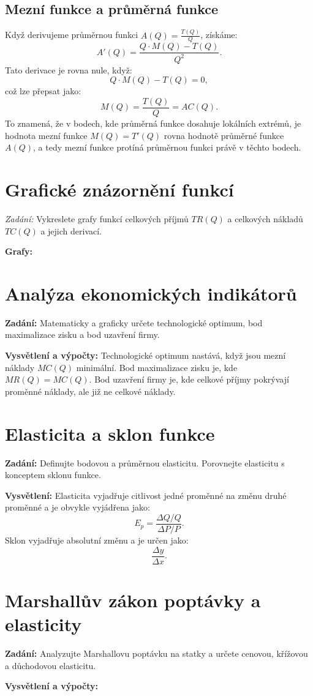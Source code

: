 \documentclass{article}
\begin{document}
\subsection{Mezní funkce a průměrná funkce}
Když derivujeme průměrnou funkci \( A(Q) = \frac{T(Q)}{Q} \), získáme:
\[ A'(Q) = \frac{Q \cdot M(Q) - T(Q)}{Q^2}. \]
Tato derivace je rovna nule, když:
\[ Q \cdot M(Q) - T(Q) = 0, \]
což lze přepsat jako:
\[ M(Q) = \frac{T(Q)}{Q} = AC(Q). \]
To znamená, že v bodech, kde průměrná funkce dosahuje lokálních extrémů, je hodnota mezní funkce \( M(Q) = T'(Q) \) rovna hodnotě průměrné funkce \( A(Q) \), a tedy mezní funkce protíná průměrnou funkci právě v těchto bodech.

\section{Grafické znázornění funkcí}
\textit{Zadání:} Vykreslete grafy funkcí celkových příjmů \(TR(Q)\) a celkových nákladů \(TC(Q)\) a jejich derivací.

\textbf{Grafy:}

\section{Analýza ekonomických indikátorů}
\textbf{Zadání:} Matematicky a graficky určete technologické optimum, bod maximalizace zisku a bod uzavření firmy.

\textbf{Vysvětlení a výpočty:}
Technologické optimum nastává, když jsou mezní náklady \(MC(Q)\) minimální. Bod maximalizace zisku je, kde \(MR(Q) = MC(Q)\). Bod uzavření firmy je, kde celkové příjmy pokrývají proměnné náklady, ale již ne celkové náklady.

\section{Elasticita a sklon funkce}
\textbf{Zadání:} Definujte bodovou a průměrnou elasticitu. Porovnejte elasticitu s konceptem sklonu funkce.

\textbf{Vysvětlení:}
Elasticita vyjadřuje citlivost jedné proměnné na změnu druhé proměnné a je obvykle vyjádřena jako:
\[ E_p = \frac{\Delta Q / Q}{\Delta P / P}. \]
Sklon vyjadřuje absolutní změnu a je určen jako:
\[ \frac{\Delta y}{\Delta x}. \]

\section{Marshallův zákon poptávky a elasticity}
\textbf{Zadání:} Analyzujte Marshallovu poptávku na statky a určete cenovou, křížovou a důchodovou elasticitu.

\textbf{Vysvětlení a výpočty:}
\end{document}
